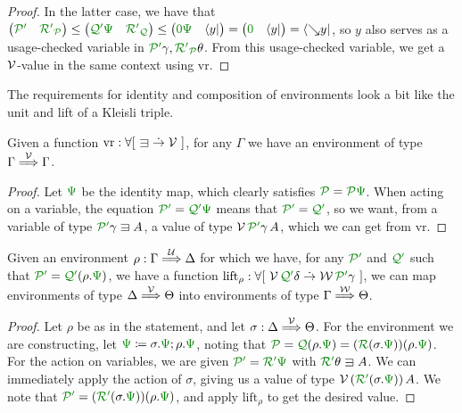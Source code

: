\begin{proof}
  In the latter case, we have that
  $\begin{pmatrix} \grPprime & \grR\gr'_\grP \end{pmatrix}
  \leq \begin{pmatrix} \grQprime\gr\Psi & \grR\gr'_\grQ \end{pmatrix}
  \leq \begin{pmatrix} \gr0\gr\Psi & \langle y \rvert \end{pmatrix}
  = \begin{pmatrix} \gr0 & \langle y \rvert \end{pmatrix}
  = \left\langle {\searrow}y \right\rvert$, so $y$ also serves as a
  usage-checked variable in $\grPprime\gamma, \grR\gr'_\grP\theta$.
  From this usage-checked variable, we get a $\mathcal V$-value in the same context
  using $\mathrm{vr}$.
\end{proof}

The requirements for identity and composition of environments look a bit like
the unit and lift of a Kleisli triple.

\begin{lemma}
  Given a function $\mathrm{vr} : \forallb{{\sqni} \dotto \V}$, for any
  $\Gamma$ we have an environment of type $\Gamma \stackrel{\mathcal V}\Longrightarrow \Gamma$.
\end{lemma}
\begin{proof}
  Let $\gr\Psi$ be the identity map, which clearly satisfies
  $\grP = \grP\gr\Psi$.
  When acting on a variable, the equation $\grPprime = \grQprime\gr\Psi$ means
  that $\grPprime = \grQprime$, so we want, from a variable of type
  $\grPprime\gamma \sqni A$, a value of type $\V\,\grPprime\gamma\,A$, which
  we can get from $\mathrm{vr}$.
\end{proof}

\begin{lemma}\label{thm:env-comp-lemma}
  Given an environment $\rho : \Gamma \stackrel{\mathcal U}\Longrightarrow \Delta$ for which we have, for any
  $\grPprime$ and $\grQprime$ such that
  $\grPprime = \grQprime\plr{\rho.\gr\Psi}$, we have a function
  $\mathrm{lift}_\rho :
  \forallb{\V\,\grQprime\delta \dotto \W\,\grPprime\gamma}$,
  we can map environments of type $\Delta \stackrel{\mathcal V}\Longrightarrow \Theta$ into environments of
  type $\Gamma \stackrel{\mathcal W}\Longrightarrow \Theta$.
\end{lemma}
\begin{proof}
  Let $\rho$ be as in the statement, and let $\sigma : \Delta \stackrel{\mathcal V}\Longrightarrow \Theta$.
  For the environment we are constructing, let
  $\gr\Psi \coloneqq \sigma.\gr\Psi; \rho.\gr\Psi$, noting that
  $\grP = \grQ\plr{\rho.\gr\Psi} =
  \plr{\grR\plr{\sigma.\gr\Psi}}\plr{\rho.\gr\Psi}$.
  For the action on variables, we are given $\grPprime = \grRprime\gr\Psi$ with
  $\grRprime\theta \sqni A$.
  We can immediately apply the action of $\sigma$, giving us a value of type
  $\V\,\plr{\grRprime\plr{\sigma.\gr\Psi}}\,A$.
  We note that
  $\grPprime = \plr{\grRprime\plr{\sigma.\gr\Psi}}\plr{\rho.\gr\Psi}$, and
  apply $\mathrm{lift}_\rho$ to get the desired value.
\end{proof}

